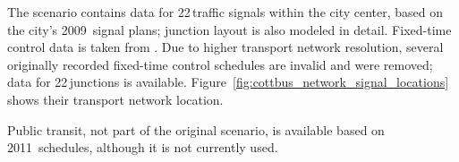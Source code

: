The scenario contains data for 22\,traffic signals within the city center, based on the city's 2009~signal plans; junction layout is also modeled in detail. Fixed-time control data is taken from \citet{KoehlerStrehler2010SignalDemandOptimization}.  
Due to higher transport network resolution, several originally recorded fixed-time control schedules are invalid and were removed; data for 22\,junctions is available. 
Figure~\ref{fig:cottbus_network_signal_locations} shows their transport network location.  

Public transit, not part of the original scenario, is available based on 2011~schedules, although it is not currently used. 

